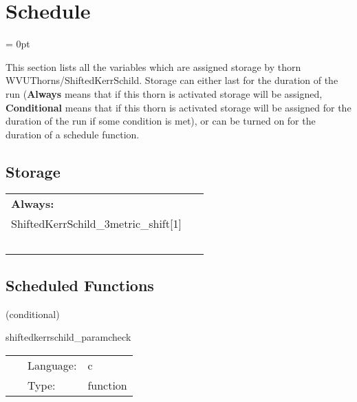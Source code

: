 \section{Schedule} 


\parskip = 0pt


\noindent This section lists all the variables which are assigned storage by thorn WVUThorns/ShiftedKerrSchild.  Storage can either last for the duration of the run ({\bf Always} means that if this thorn is activated storage will be assigned, {\bf Conditional} means that if this thorn is activated storage will be assigned for the duration of the run if some condition is met), or can be turned on for the duration of a schedule function.


\subsection*{Storage}

\hspace{5mm}

 \begin{tabular*}{160mm}{ll} 

{\bf Always:}&  ~ \\ 
 ShiftedKerrSchild\_3metric\_shift[1] & ~\\ 
~ & ~\\ 
\end{tabular*} 


\subsection*{Scheduled Functions}
\vspace{5mm}

   (conditional) 

\hspace{5mm} shiftedkerrschild\_paramcheck 

\hspace{5mm}{\it check parameters for consitency and unsupported values } 


\hspace{5mm}

 \begin{tabular*}{160mm}{cll} 
~ & Language:  & c \\ 
~ & Type:  & function \\ 
\end{tabular*} 


\vspace{5mm}


